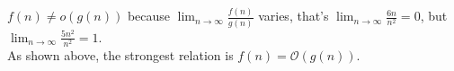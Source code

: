 \begin{parts}
\begin{customsolutionbox}
        $f(n) \not= o(g(n))$ because $\displaystyle \lim_{n \to \infty} \frac{f(n)}{g(n)}$ varies, that's 
        $\displaystyle \lim_{n \to \infty} \frac{6n}{n^2} = 0$, but $\displaystyle \lim_{n \to \infty} \frac{5n^2}{n^2} = 1$. \\

        As shown above, the strongest relation is $f(n) = \mathcal{O}(g(n))$.

    \end{customsolutionbox}
\end{parts}